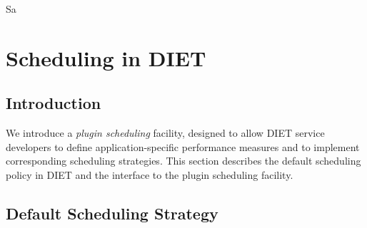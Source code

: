 Sa%


\newenvironment{code}
{\begin{list}{}{\setlength{\leftmargin}{1em}}\item\bfseries\tt}
{\end{list}}

\newenvironment{tinycode}
{\begin{list}{}{\setlength{\leftmargin}{1em}}\item\tiny\bfseries\tt}
{\end{list}}


\chapter{Scheduling in DIET}
\label{ch:plugin}

\section{Introduction}

We introduce a
\emph{plugin scheduling} facility, designed to allow DIET service
developers to define application-specific performance measures and
to implement corresponding scheduling strategies.  This section
describes the default scheduling policy in DIET and the interface to
the plugin scheduling facility.

\section{Default Scheduling Strategy}\label{sect:default_sched}

